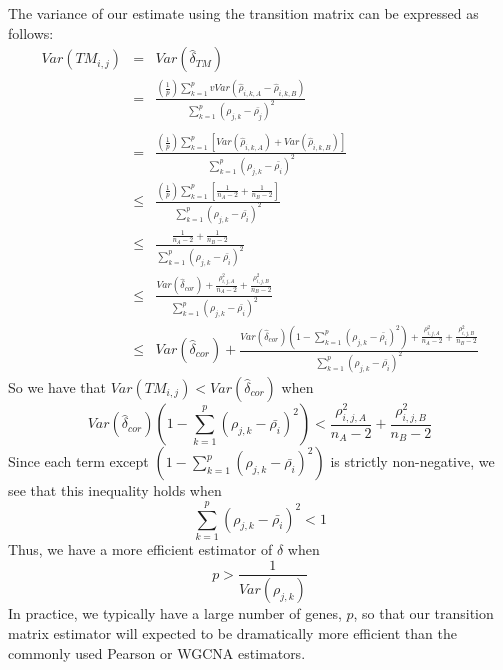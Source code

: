 \documentclass[english]{article}
\begin{document}
The variance of our estimate using the transition matrix can be expressed
as follows:
\begin{eqnarray*}
Var\left(TM_{i,j}\right) & = & Var\left(\hat{\delta}_{TM}\right)\\
 & = & \frac{\left(\frac{1}{p}\right)\sum_{k=1}^{p}vVar\left(\hat{\rho}_{i,k,A}-\hat{\rho}_{i,k,B}\right)}{\sum_{k=1}^{p}\left(\rho_{j,k}-\bar{\rho_{j}}\right)^{2}}\\
\\
 & = & \frac{\left(\frac{1}{p}\right)\sum_{k=1}^{p}\left[Var\left(\hat{\rho}_{i,k,A}\right)+Var\left(\hat{\rho}_{i,k,B}\right)\right]}{\sum_{k=1}^{p}\left(\rho_{j,k}-\bar{\rho_{i}}\right)^{2}}\\
 & \le & \frac{\left(\frac{1}{p}\right)\sum_{k=1}^{p}\left[\frac{1}{n_{A}-2}+\frac{1}{n_{B}-2}\right]}{\sum_{k=1}^{p}\left(\rho_{j,k}-\bar{\rho_{i}}\right)^{2}}\\
 & \le & \frac{\frac{1}{n_{A}-2}+\frac{1}{n_{B}-2}}{\sum_{k=1}^{p}\left(\rho_{j,k}-\bar{\rho_{i}}\right)^{2}}\\
 & \le & \frac{Var\left(\hat{\delta}_{cor}\right)+\frac{\rho_{i,j,A}^{2}}{n_{A}-2}+\frac{\rho_{i,j,B}^{2}}{n_{B}-2}}{\sum_{k=1}^{p}\left(\rho_{j,k}-\bar{\rho_{i}}\right)^{2}}\\
 & \le & Var\left(\hat{\delta}_{cor}\right)+\frac{Var\left(\hat{\delta}_{cor}\right)\left(1-\sum_{k=1}^{p}\left(\rho_{j,k}-\bar{\rho_{i}}\right)^{2}\right)+\frac{\rho_{i,j,A}^{2}}{n_{A}-2}+\frac{\rho_{i,j,B}^{2}}{n_{B}-2}}{\sum_{k=1}^{p}\left(\rho_{j,k}-\bar{\rho_{i}}\right)^{2}}
\end{eqnarray*}
So we have that $Var\left(TM_{i,j}\right)<Var\left(\hat{\delta}_{cor}\right)$
when
\[
Var\left(\hat{\delta}_{cor}\right)\left(1-\sum_{k=1}^{p}\left(\rho_{j,k}-\bar{\rho_{i}}\right)^{2}\right)<\frac{\rho_{i,j,A}^{2}}{n_{A}-2}+\frac{\rho_{i,j,B}^{2}}{n_{B}-2}
\]
Since each term except $\left(1-\sum_{k=1}^{p}\left(\rho_{j,k}-\bar{\rho_{i}}\right)^{2}\right)$
is strictly non-negative, we see that this inequality holds when 
\[
\sum_{k=1}^{p}\left(\rho_{j,k}-\bar{\rho_{i}}\right)^{2}<1
\]
Thus, we have a more efficient estimator of $\delta$ when 
\[
p>\frac{1}{Var\left(\rho_{j,k}\right)}
\]
In practice, we typically have a large number of genes, $p$, so that
our transition matrix estimator will expected to be dramatically more
efficient than the commonly used Pearson or WGCNA estimators.



\end{document}
